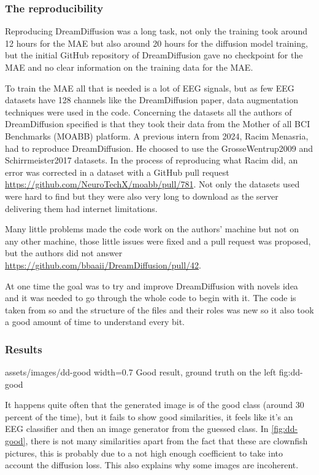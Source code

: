 \subsubsection{The reproducibility}

Reproducing DreamDiffusion was a long task, not only the training took around 12
hours for the MAE but also around 20 hours for the diffusion model training, but
the initial GitHub repository of DreamDiffusion gave no checkpoint for the MAE
and no clear information on the training data for the MAE.

To train the MAE all that is needed is a lot of EEG signals, but as few EEG
datasets have 128 channels like the DreamDiffusion paper, data augmentation
techniques were used in the code. Concerning the datasets all the authors of
DreamDiffusion specified is that they took their data from the Mother of all BCI
Benchmarks \cite{moabb} (MOABB) platform. A previous intern from 2024, Racim
Menasria, had to reproduce DreamDiffusion. He choosed to use the
GrosseWentrup2009 \cite{GrosseWentrup2009} and Schirrmeister2017
\cite{Schirrmeister2017} datasets. In the process of reproducing what Racim did,
an error was corrected in a dataset with a GitHub pull request
\url{https://github.com/NeuroTechX/moabb/pull/781}. Not only the datasets used
were hard to find but they were also very long to download as the server
delivering them had internet limitations.

Many little problems made the code work on the authors' machine but not on any
other machine, those little issues were fixed and a pull request was proposed,
but the authors did not answer
\url{https://github.com/bbaaii/DreamDiffusion/pull/42}.

At one time the goal was to try and improve DreamDiffusion with novels idea and
it was needed to go through the whole code to begin with it. The code is taken
from \cite{mindvis} so and the structure of the files and their roles was new so
it also took a good amount of time to understand every bit.

\subsubsection{Results}

\insertfigure
    {assets/images/dd-good}
    {width=0.7\textwidth}
    {Good result, ground truth on the left}
    {fig:dd-good}

It happens quite often that the generated image is of the good class (around 30
percent of the time), but it fails to show good similarities, it feels like it's
an EEG classifier and then an image generator from the guessed class. In
\cref{fig:dd-good}, there is not many similarities apart from the fact that
these are clownfish pictures, this is probably due to a not high enough
coefficient to take into account the diffusion loss. This also explains why some
images are incoherent.

